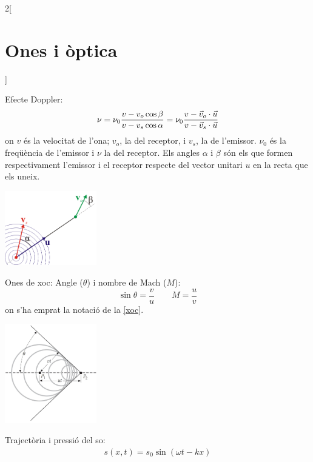 \documentclass[../../../main.tex]{subfiles}
\begin{document}
\begin{multicols}{2}[\section{Ones i òptica}]
\begin{minipage}{\linewidth}
    \label{diff}
  \end{minipage}
  Efecte Doppler:
  \begin{equation*}
    \nu=\nu_0\frac{v-v_o\cos\beta}{v- v_s\cos\alpha}=\nu_0\frac{v-\Vec{v}_o\cdot\Vec{u}}{v- \Vec{v}_s\cdot\Vec{u}}\\
  \end{equation*}
  {\footnotesize on $v$ és la velocitat de l'ona; $v_o$, la del receptor, i $v_s$, la de l'emissor. $\nu_0$ és la freqüència de l'emissor i $\nu$ la del receptor. Els angles $\alpha$ i $\beta$ són els que formen respectivament l'emissor i el receptor respecte del vector unitari $u$ en la recta que els uneix.}\newline
  \begin{minipage}{\linewidth}
    \centering
    \includegraphics[width=4cm]{Physics/1st/Waves_and_optics/Images/dopp.png}
    \label{dopp}
  \end{minipage}
  Ones de xoc:
  Angle ($\theta$) i nombre de Mach ($M$): $$\sin\theta=\frac{v}{u}\qquad M=\frac{u}{v}$$ {\footnotesize on s'ha emprat la notació de la \cref{xoc}.}\newline
  \begin{minipage}{\linewidth}
    \centering
    \includegraphics[width=4cm]{Physics/1st/Waves_and_optics/Images/onesdexoc.jpg}
    \label{xoc}
  \end{minipage}
  Trajectòria i pressió del so:
  \begin{gather*}
    s(x,t)=s_0\sin\left(\omega t-kx\right)\\

\end{gather*}
\end{multicols}
\end{document}
